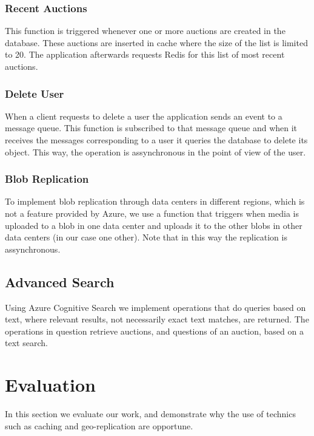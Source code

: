 \documentclass[runningheads]{llncs}
\begin{document}
\subsubsection{Recent Auctions}

This function is triggered whenever one or more auctions are created in the database. These auctions are inserted in cache where the size of the list is limited to 20. The application afterwards requests Redis for this list of most recent auctions.

\subsubsection{Delete User}

When a client requests to delete a user the application sends an event to a message queue. This function is subscribed to that message queue and when it receives the messages corresponding to a user it queries the database to delete its object. This way, the operation is assynchronous in the point of view of the user.

\subsubsection{Blob Replication}

To implement blob replication through data centers in different regions, which is not a feature provided by Azure, we use a function that triggers when media is uploaded to a blob in one data center and uploads it to the other blobs in other data centers (in our case one other). Note that in this way the replication is assynchronous.

\subsection{Advanced Search}

Using Azure Cognitive Search we implement operations that do queries based on text, where relevant results, not necessarily exact text matches, are returned. The operations in question retrieve auctions, and questions of an auction, based on a text search.

\section{Evaluation}

In this section we evaluate our work, and demonstrate why the use of technics such as caching and geo-replication are opportune.
\end{document}
